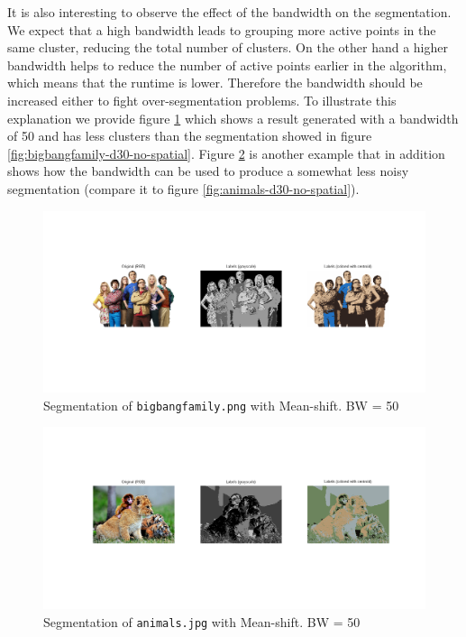 It is also interesting to observe the effect of the bandwidth on the segmentation.
We expect that a high bandwidth leads to grouping more active points in the same
cluster, reducing the total number of clusters. On the other hand a higher bandwidth
helps to reduce the number of active points earlier in the algorithm, which means
that the runtime is lower. Therefore the bandwidth should be increased either to
fight over-segmentation problems. To illustrate this explanation we provide figure
\ref{fig:bigbangfamily-d50-no-spatial} which shows a result generated with a
bandwidth of 50 and has less clusters than the segmentation showed in figure
\ref{fig:bigbangfamily-d30-no-spatial}. Figure \ref{fig:animals-d50-no-spatial} is another
example that in addition shows how the bandwidth can be used to produce a somewhat less noisy
segmentation (compare it to figure \ref{fig:animals-d30-no-spatial}).

\begin{figure}[hbt]
\centering
\includegraphics[trim={50px 100px 50px 100px},clip,width=\textwidth]{img/mshift/bigbang_d50_no_spatial.png}
\caption{Segmentation of \texttt{bigbangfamily.png} with Mean-shift. BW = 50}
\label{fig:bigbangfamily-d50-no-spatial}
\end{figure}

\begin{figure}[hbt]
\centering
\includegraphics[trim={50px 100px 50px 100px},clip,width=\textwidth]{img/mshift/animals_d50_no_spatial.png}
\caption{Segmentation of \texttt{animals.jpg} with Mean-shift. BW = 50}
\label{fig:animals-d50-no-spatial}
\end{figure}

